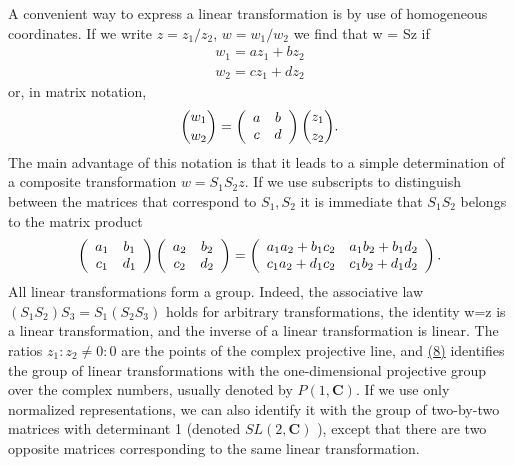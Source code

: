 A convenient way to express a linear transformation is by use of homogeneous coordinates. If we write $z = z_{1}/z_{2}$, $w = w_{1}/w_{2}$ we find that w = Sz if
\begin{equation*}
\begin{array}{l} w _ {1} = a z _ {1} + b z _ {2} \\ w _ {2} = c z _ {1} + d z _ {2} \end{array}\tag{8}\label{eq:3.8}
\end{equation*}
or, in matrix notation,
\begin{equation*}
\binom {w _ {1}} {w _ {2}} = \left( \begin{array}{c c} a & b \\ c & d \end{array} \right) \binom {z _ {1}} {z _ {2}}.
\end{equation*}
The main advantage of this notation is that it leads to a simple determination of a composite transformation $w = S_{1}S_{2}z$. If we use subscripts to distinguish between the matrices that correspond to $S_{1}, S_{2}$ it is immediate that $S_{1}S_{2}$ belongs to the matrix product
\begin{equation*}
\left( \begin{array}{c c} a _ {1} & b _ {1} \\ c _ {1} & d _ {1} \end{array} \right) \left( \begin{array}{c c} a _ {2} & b _ {2} \\ c _ {2} & d _ {2} \end{array} \right) = \left( \begin{array}{c c} a _ {1} a _ {2} + b _ {1} c _ {2} & a _ {1} b _ {2} + b _ {1} d _ {2} \\ c _ {1} a _ {2} + d _ {1} c _ {2} & c _ {1} b _ {2} + d _ {1} d _ {2} \end{array} \right).
\end{equation*}
All linear transformations form a group. Indeed, the associative law $(S_{1}S_{2})S_{3}=S_{1}(S_{2}S_{3})$ holds for arbitrary transformations, the identity w=z is a linear transformation, and the inverse of a linear transformation is linear. The ratios $z_{1}:z_{2}\neq0:0$ are the points of the complex projective line, and \hyperref[eq:3.8]{(8)} identifies the group of linear transformations with the one-dimensional projective group over the complex numbers, usually denoted by $P(1,\mathbf{C})$. If we use only normalized representations, we can also identify it with the group of two-by-two matrices with determinant 1 (denoted $SL(2,\mathbf{C})$ ), except that there are two opposite matrices corresponding to the same linear transformation.

